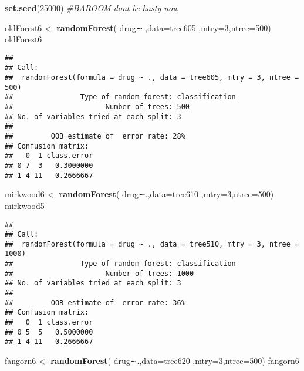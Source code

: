 \documentclass[]{article}
\newenvironment{Shaded}{\begin{snugshade}}{\end{snugshade}}
\newcommand{\KeywordTok}[1]{\textcolor[rgb]{0.13,0.29,0.53}{\textbf{#1}}}
\newcommand{\DataTypeTok}[1]{\textcolor[rgb]{0.13,0.29,0.53}{#1}}
\newcommand{\DecValTok}[1]{\textcolor[rgb]{0.00,0.00,0.81}{#1}}
\newcommand{\StringTok}[1]{\textcolor[rgb]{0.31,0.60,0.02}{#1}}
\newcommand{\CommentTok}[1]{\textcolor[rgb]{0.56,0.35,0.01}{\textit{#1}}}
\newcommand{\NormalTok}[1]{#1}
\begin{document}
\begin{Shaded}
\begin{Highlighting}[]
\KeywordTok{set.seed}\NormalTok{(}\DecValTok{25000}\NormalTok{)}
\CommentTok{#BAROOM dont be hasty now}

\NormalTok{oldForest6 <-}\StringTok{ }\KeywordTok{randomForest}\NormalTok{( drug∼.,}\DataTypeTok{data=}\NormalTok{tree605  ,}\DataTypeTok{mtry=}\DecValTok{3}\NormalTok{,}\DataTypeTok{ntree=}\DecValTok{500}\NormalTok{)}
\NormalTok{oldForest6}
\end{Highlighting}
\end{Shaded}

\begin{verbatim}
## 
## Call:
##  randomForest(formula = drug ~ ., data = tree605, mtry = 3, ntree = 500) 
##                Type of random forest: classification
##                      Number of trees: 500
## No. of variables tried at each split: 3
## 
##         OOB estimate of  error rate: 28%
## Confusion matrix:
##   0  1 class.error
## 0 7  3   0.3000000
## 1 4 11   0.2666667
\end{verbatim}

\begin{Shaded}
\begin{Highlighting}[]
\NormalTok{mirkwood6 <-}\StringTok{ }\KeywordTok{randomForest}\NormalTok{( drug∼.,}\DataTypeTok{data=}\NormalTok{tree610  ,}\DataTypeTok{mtry=}\DecValTok{3}\NormalTok{,}\DataTypeTok{ntree=}\DecValTok{500}\NormalTok{)}
\NormalTok{mirkwood5}
\end{Highlighting}
\end{Shaded}

\begin{verbatim}
## 
## Call:
##  randomForest(formula = drug ~ ., data = tree510, mtry = 3, ntree = 1000) 
##                Type of random forest: classification
##                      Number of trees: 1000
## No. of variables tried at each split: 3
## 
##         OOB estimate of  error rate: 36%
## Confusion matrix:
##   0  1 class.error
## 0 5  5   0.5000000
## 1 4 11   0.2666667
\end{verbatim}

\begin{Shaded}
\begin{Highlighting}[]
\NormalTok{fangorn6 <-}\StringTok{ }\KeywordTok{randomForest}\NormalTok{( drug∼.,}\DataTypeTok{data=}\NormalTok{tree620  ,}\DataTypeTok{mtry=}\DecValTok{3}\NormalTok{,}\DataTypeTok{ntree=}\DecValTok{500}\NormalTok{)}
\NormalTok{fangorn6}
\end{Highlighting}
\end{Shaded}
\end{document}
